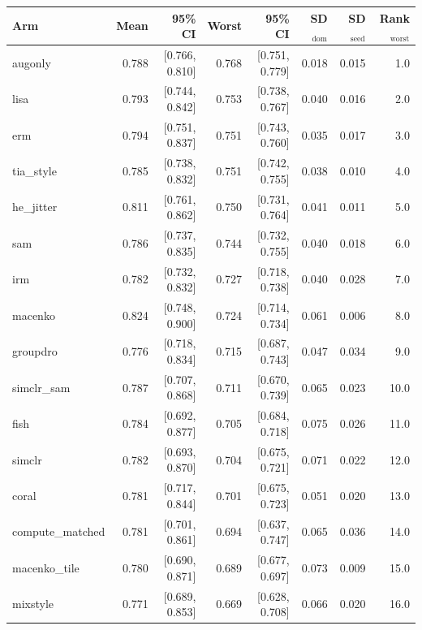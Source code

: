 \begin{tabular}{lrrrrrrr}
\toprule
Arm & Mean & 95\% CI & Worst & 95\% CI & SD$_\text{dom}$ & SD$_\text{seed}$ & Rank$_\text{worst}$ \\
\midrule
augonly & 0.788 & [0.766, 0.810] & 0.768 & [0.751, 0.779] & 0.018 & 0.015 & 1.0 \\
lisa & 0.793 & [0.744, 0.842] & 0.753 & [0.738, 0.767] & 0.040 & 0.016 & 2.0 \\
erm & 0.794 & [0.751, 0.837] & 0.751 & [0.743, 0.760] & 0.035 & 0.017 & 3.0 \\
tia\_style & 0.785 & [0.738, 0.832] & 0.751 & [0.742, 0.755] & 0.038 & 0.010 & 4.0 \\
he\_jitter & 0.811 & [0.761, 0.862] & 0.750 & [0.731, 0.764] & 0.041 & 0.011 & 5.0 \\
sam & 0.786 & [0.737, 0.835] & 0.744 & [0.732, 0.755] & 0.040 & 0.018 & 6.0 \\
irm & 0.782 & [0.732, 0.832] & 0.727 & [0.718, 0.738] & 0.040 & 0.028 & 7.0 \\
macenko & 0.824 & [0.748, 0.900] & 0.724 & [0.714, 0.734] & 0.061 & 0.006 & 8.0 \\
groupdro & 0.776 & [0.718, 0.834] & 0.715 & [0.687, 0.743] & 0.047 & 0.034 & 9.0 \\
simclr\_sam & 0.787 & [0.707, 0.868] & 0.711 & [0.670, 0.739] & 0.065 & 0.023 & 10.0 \\
fish & 0.784 & [0.692, 0.877] & 0.705 & [0.684, 0.718] & 0.075 & 0.026 & 11.0 \\
simclr & 0.782 & [0.693, 0.870] & 0.704 & [0.675, 0.721] & 0.071 & 0.022 & 12.0 \\
coral & 0.781 & [0.717, 0.844] & 0.701 & [0.675, 0.723] & 0.051 & 0.020 & 13.0 \\
compute\_matched & 0.781 & [0.701, 0.861] & 0.694 & [0.637, 0.747] & 0.065 & 0.036 & 14.0 \\
macenko\_tile & 0.780 & [0.690, 0.871] & 0.689 & [0.677, 0.697] & 0.073 & 0.009 & 15.0 \\
mixstyle & 0.771 & [0.689, 0.853] & 0.669 & [0.628, 0.708] & 0.066 & 0.020 & 16.0 \\
\bottomrule
\end{tabular}
